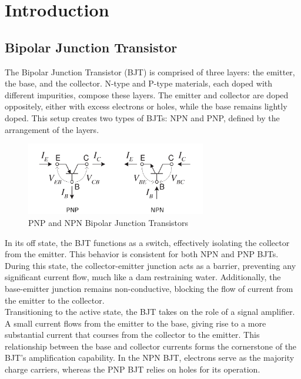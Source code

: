 \section{Introduction}

    \subsection{Bipolar Junction Transistor}
        The Bipolar Junction Transistor (BJT) is comprised of three layers: the emitter, the base, and the collector. 
        N-type and P-type materials, each doped with different impurities, compose these layers. 
        The emitter and collector are doped oppositely, either with excess electrons or holes, while the base remains lightly doped. 
        This setup creates two types of BJTs: NPN and PNP, defined by the arrangement of the layers.
        \begin{figure}[H]
            \centering
            \includegraphics[width=0.7\textwidth]{figures/PNP_NPN.png}
            \caption{PNP and NPN Bipolar Junction Transistors}
            \label{fig:PNP_NPN}
        \end{figure}
        \noindent
        In its off state, the BJT functions as a switch, effectively isolating the collector from the emitter. 
        This behavior is consistent for both NPN and PNP BJTs. During this state, the collector-emitter junction acts as a barrier, preventing any significant current flow, much like a dam restraining water. 
        Additionally, the base-emitter junction remains non-conductive, blocking the flow of current from the emitter to the collector. \\
        Transitioning to the active state, the BJT takes on the role of a signal amplifier. A small current flows from the emitter to the base, giving rise to a more substantial current that courses from the collector to the emitter. 
        This relationship between the base and collector currents forms the cornerstone of the BJT's amplification capability. 
        In the NPN BJT, electrons serve as the majority charge carriers, whereas the PNP BJT relies on holes for its operation. 
